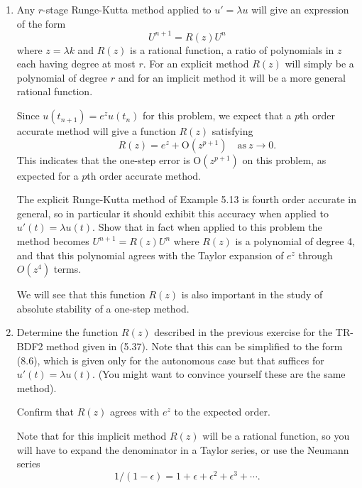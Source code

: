 \documentclass[10pt]{amsart}
\newcommand{\bigo}{{\mathrm O}}
\begin{document}
\begin{enumerate}[label={\bf Problem~{\arabic*}:}]

\mline
\item 
Any $r$-stage Runge-Kutta method applied to $u'=\lambda u$ will give an
expression of the form
\[
U^{n+1} = R(z)U^n
\]
where $z=\lambda k$ and $R(z)$ is a rational function, a ratio of
polynomials in $z$ each having degree at most $r$.  For an explicit method
$R(z)$ will simply be a polynomial of degree $r$ and for an implicit method
it will be a more general rational function.

Since $u(t_{n+1}) = e^z u(t_n)$ for this problem, we expect that a $p$th
order accurate method will give a function $R(z)$ satisfying
\[
\qquad  R(z) = e^z + \bigo(z^{p+1}) \quad\text{as}~z \to 0.
\]
This indicates that the one-step error is $\bigo(z^{p+1})$ on this problem,
as expected for a $p$th order accurate method.

The explicit
Runge-Kutta method of Example 5.13 is fourth order accurate in general,
so in particular it should exhibit this accuracy when applied to 
$u'(t) = \lambda u(t)$.  Show that in fact when applied to this
problem the method becomes $U^{n+1} = R(z)U^n$ where $R(z)$ is 
a polynomial of degree 4, and that this polynomial agrees with the Taylor
expansion of $e^z$ through $O(z^4)$ terms.

We will see that this function $R(z)$ is also important in the study of 
absolute stability of a one-step method.




\mline
\item

Determine the function $R(z)$ described in the previous exercise for the
TR-BDF2 method given in (5.37).  Note that this can be simplified to the
form (8.6), which is given only for the autonomous case but that suffices
for $u'(t) = \lambda u(t)$.  (You might want to convince yourself these are 
the same method).

Confirm that $R(z)$ agrees with $e^z$ to the expected order.

Note that for this implicit method $R(z)$ will be a rational function, so you
will have to expand the denominator in a Taylor series, or use the Neumann
series 
\[
1/(1-\epsilon) = 1 + \epsilon + \epsilon^2 + \epsilon^3 + \cdots.
\]


\end{enumerate}
\end{document}
